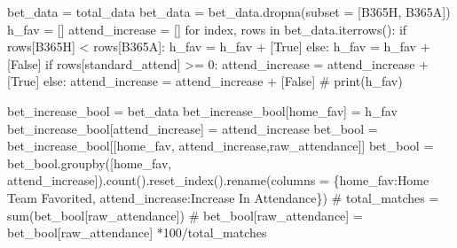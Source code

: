 \documentclass[
  letterpaper,
  DIV=11,
  numbers=noendperiod]{scrartcl}
\newenvironment{Shaded}{\begin{snugshade}}{\end{snugshade}}
\newcommand{\CommentTok}[1]{\textcolor[rgb]{0.37,0.37,0.37}{#1}}
\newcommand{\ControlFlowTok}[1]{\textcolor[rgb]{0.00,0.23,0.31}{#1}}
\newcommand{\DecValTok}[1]{\textcolor[rgb]{0.68,0.00,0.00}{#1}}
\newcommand{\KeywordTok}[1]{\textcolor[rgb]{0.00,0.23,0.31}{#1}}
\newcommand{\NormalTok}[1]{\textcolor[rgb]{0.00,0.23,0.31}{#1}}
\newcommand{\OperatorTok}[1]{\textcolor[rgb]{0.37,0.37,0.37}{#1}}
\newcommand{\StringTok}[1]{\textcolor[rgb]{0.13,0.47,0.30}{#1}}
\newcommand{\VariableTok}[1]{\textcolor[rgb]{0.07,0.07,0.07}{#1}}
\begin{document}
\begin{Shaded}
\begin{Highlighting}[]
\NormalTok{bet\_data }\OperatorTok{=}\NormalTok{ total\_data}
\NormalTok{bet\_data }\OperatorTok{=}\NormalTok{ bet\_data.dropna(subset }\OperatorTok{=}\NormalTok{ [}\StringTok{\textquotesingle{}B365H\textquotesingle{}}\NormalTok{, }\StringTok{\textquotesingle{}B365A\textquotesingle{}}\NormalTok{])}
\NormalTok{h\_fav }\OperatorTok{=}\NormalTok{ []}
\NormalTok{attend\_increase }\OperatorTok{=}\NormalTok{ []}
\ControlFlowTok{for}\NormalTok{ index, rows }\KeywordTok{in}\NormalTok{ bet\_data.iterrows():}
    \ControlFlowTok{if}\NormalTok{ rows[}\StringTok{\textquotesingle{}B365H\textquotesingle{}}\NormalTok{] }\OperatorTok{\textless{}}\NormalTok{ rows[}\StringTok{\textquotesingle{}B365A\textquotesingle{}}\NormalTok{]:}
\NormalTok{        h\_fav }\OperatorTok{=}\NormalTok{ h\_fav }\OperatorTok{+}\NormalTok{ [}\VariableTok{True}\NormalTok{]}
    \ControlFlowTok{else}\NormalTok{:}
\NormalTok{        h\_fav }\OperatorTok{=}\NormalTok{ h\_fav }\OperatorTok{+}\NormalTok{ [}\VariableTok{False}\NormalTok{]}
    \ControlFlowTok{if}\NormalTok{ rows[}\StringTok{\textquotesingle{}standard\_attend\textquotesingle{}}\NormalTok{] }\OperatorTok{\textgreater{}=} \DecValTok{0}\NormalTok{:}
\NormalTok{        attend\_increase }\OperatorTok{=}\NormalTok{ attend\_increase }\OperatorTok{+}\NormalTok{ [}\VariableTok{True}\NormalTok{]}
    \ControlFlowTok{else}\NormalTok{:}
\NormalTok{        attend\_increase }\OperatorTok{=}\NormalTok{ attend\_increase }\OperatorTok{+}\NormalTok{ [}\VariableTok{False}\NormalTok{]}
\CommentTok{\# print(h\_fav)}
        
\NormalTok{bet\_increase\_bool }\OperatorTok{=}\NormalTok{ bet\_data}
\NormalTok{bet\_increase\_bool[}\StringTok{\textquotesingle{}home\_fav\textquotesingle{}}\NormalTok{] }\OperatorTok{=}\NormalTok{ h\_fav}
\NormalTok{bet\_increase\_bool[}\StringTok{\textquotesingle{}attend\_increase\textquotesingle{}}\NormalTok{] }\OperatorTok{=}\NormalTok{ attend\_increase}
\NormalTok{bet\_bool }\OperatorTok{=}\NormalTok{ bet\_increase\_bool[[}\StringTok{\textquotesingle{}home\_fav\textquotesingle{}}\NormalTok{, }\StringTok{\textquotesingle{}attend\_increase\textquotesingle{}}\NormalTok{,}\StringTok{\textquotesingle{}raw\_attendance\textquotesingle{}}\NormalTok{]]}
\NormalTok{bet\_bool }\OperatorTok{=}\NormalTok{ bet\_bool.groupby([}\StringTok{\textquotesingle{}home\_fav\textquotesingle{}}\NormalTok{, }\StringTok{\textquotesingle{}attend\_increase\textquotesingle{}}\NormalTok{]).count().reset\_index().rename(columns }\OperatorTok{=}\NormalTok{ \{}\StringTok{\textquotesingle{}home\_fav\textquotesingle{}}\NormalTok{:}\StringTok{\textquotesingle{}Home Team Favorited\textquotesingle{}}\NormalTok{, }\StringTok{\textquotesingle{}attend\_increase\textquotesingle{}}\NormalTok{:}\StringTok{\textquotesingle{}Increase In Attendance\textquotesingle{}}\NormalTok{\})}
\CommentTok{\# total\_matches = sum(bet\_bool[\textquotesingle{}raw\_attendance\textquotesingle{}])}
\CommentTok{\# bet\_bool[\textquotesingle{}raw\_attendance\textquotesingle{}] = bet\_bool[\textquotesingle{}raw\_attendance\textquotesingle{}] *100/total\_matches}


\end{Highlighting}
\end{Shaded}
\end{document}
